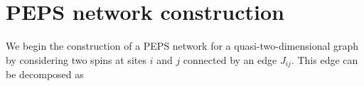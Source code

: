 

\section{PEPS network construction}
We begin the construction of a PEPS network for a quasi-two-dimensional graph
by considering two spins at sites $i$ and $j$ connected by an edge $J_{ij}$.
This edge can be decomposed as

